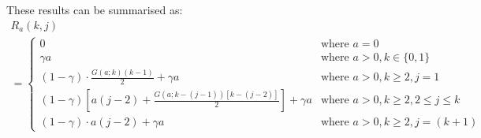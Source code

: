 These results can be summarised as:
\begin{multline}
	R_{a} (k, j) \\
	= \begin{cases}
		0 & \text{where $a = 0$} \\
		\gamma a & \text{where $a > 0, k \in \{ 0, 1 \}$} \\
		(1 - \gamma) \cdot \frac{G (a; k) (k - 1)}{2} + \gamma a & \text{where $a > 0, k \geq 2, j = 1$} \\
		(1 - \gamma) \left[ a (j - 2) + \frac{G (a; k - (j - 1)) [k - (j - 2)]}{2} \right] + \gamma a & 	\text{where $a > 0, k \geq 2, 2 \leq j \leq k$} \\
		(1 - \gamma) \cdot a (j - 2) + \gamma a & \text{where $a > 0, k \geq 2, j = (k + 1)$}
	\end{cases}
\end{multline}

















































